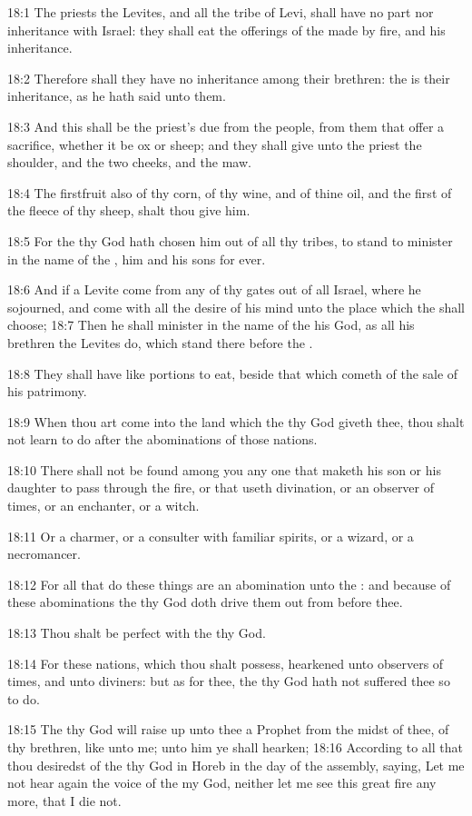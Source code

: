 18:1 The priests the Levites, and all the tribe of Levi, shall have no part nor inheritance with Israel: they shall eat the offerings of the \LORD made by fire, and his inheritance.

18:2 Therefore shall they have no inheritance among their brethren: the \LORD is their inheritance, as he hath said unto them.

18:3 And this shall be the priest's due from the people, from them that offer a sacrifice, whether it be ox or sheep; and they shall give unto the priest the shoulder, and the two cheeks, and the maw.

18:4 The firstfruit also of thy corn, of thy wine, and of thine oil, and the first of the fleece of thy sheep, shalt thou give him.

18:5 For the \LORD thy God hath chosen him out of all thy tribes, to stand to minister in the name of the \LORD, him and his sons for ever.

18:6 And if a Levite come from any of thy gates out of all Israel, where he sojourned, and come with all the desire of his mind unto the place which the \LORD shall choose; 18:7 Then he shall minister in the name of the \LORD his God, as all his brethren the Levites do, which stand there before the \LORD.

18:8 They shall have like portions to eat, beside that which cometh of the sale of his patrimony.

18:9 When thou art come into the land which the \LORD thy God giveth thee, thou shalt not learn to do after the abominations of those nations.

18:10 There shall not be found among you any one that maketh his son or his daughter to pass through the fire, or that useth divination, or an observer of times, or an enchanter, or a witch.

18:11 Or a charmer, or a consulter with familiar spirits, or a wizard, or a necromancer.

18:12 For all that do these things are an abomination unto the \LORD: and because of these abominations the \LORD thy God doth drive them out from before thee.

18:13 Thou shalt be perfect with the \LORD thy God.

18:14 For these nations, which thou shalt possess, hearkened unto observers of times, and unto diviners: but as for thee, the \LORD thy God hath not suffered thee so to do.

18:15 The \LORD thy God will raise up unto thee a Prophet from the midst of thee, of thy brethren, like unto me; unto him ye shall hearken; 18:16 According to all that thou desiredst of the \LORD thy God in Horeb in the day of the assembly, saying, Let me not hear again the voice of the \LORD my God, neither let me see this great fire any more, that I die not.

